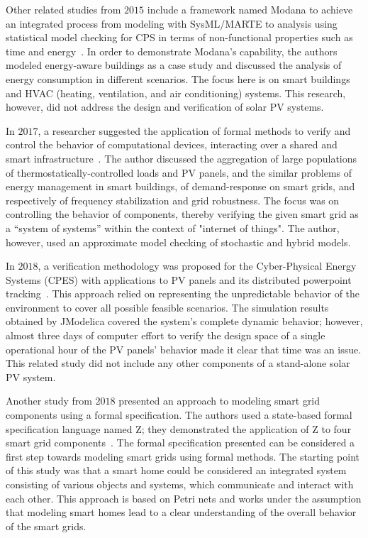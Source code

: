 Other related studies from $2015$ include a framework named Modana to achieve an integrated process from modeling with SysML/MARTE to analysis using statistical model checking for CPS in terms of non-functional properties such as time and energy~\cite{Cheng2015}. In order to demonstrate Modana's capability, the authors modeled energy-aware buildings as a case study and discussed the analysis of energy consumption in different scenarios. The focus here is on smart buildings and HVAC (heating, ventilation, and air conditioning) systems. This research, however, did not address the design and verification of solar PV systems. 
 
In $2017$, a researcher suggested the application of formal methods to verify and control the behavior of computational devices, interacting over a shared and smart infrastructure~\cite{Abate2017}. The author discussed the aggregation of large populations of thermostatically-controlled loads and PV panels, and the similar problems of energy management in smart buildings, of demand-response on smart grids, and respectively of frequency stabilization and grid robustness. The focus was on controlling the behavior of components, thereby verifying the given smart grid as a ``system of systems'' within the context of "internet of things". The author, however, used an approximate model checking of stochastic and hybrid models.

In $2018$, a verification methodology was proposed for the Cyber-Physical Energy Systems (CPES) with applications to PV panels and its distributed powerpoint tracking~\cite{Driouich2018}. This approach relied on representing the unpredictable behavior of the environment to cover all possible feasible scenarios. The simulation results obtained by JModelica covered the system's complete dynamic behavior; however, almost three days of computer effort to verify the design space of a single operational hour of the PV panels’ behavior made it clear that time was an issue. This related study did not include any other components of a stand-alone solar PV system. %

Another study from $2018$ presented an approach to modeling smart grid components using a formal specification. The authors used a state-based formal specification language named Z; they demonstrated the application of Z to four smart grid components~\cite{Akram2018}. The formal specification presented can be considered a first step towards modeling smart grids using formal methods. The starting point of this study was that a smart home could be considered an integrated system consisting of various objects and systems, which communicate and interact with each other. This approach is based on Petri nets and works under the assumption that modeling smart homes lead to a clear understanding of the overall behavior of the smart grids.

